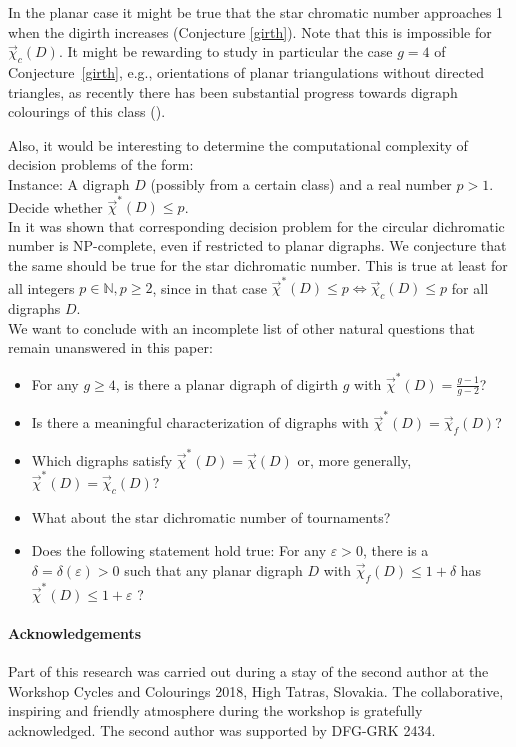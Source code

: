 \documentclass[fontsize=11pt,a4paper,DIV12]{scrartcl}
\theoremstyle{meiner}
\theoremstyle{definition}
\begin{document}
In the planar case it might be true that the star chromatic number
approaches 1 when the digirth increases (Conjecture \ref{girth}). Note
that this is impossible for $\vec{\chi}_c(D)$. It might be rewarding
to study in particular the case $g=4$ of Conjecture~\ref{girth}, e.g.,
orientations of planar triangulations without directed triangles,
as recently there has been substantial progress towards digraph
colourings of this class (\cite{mohar4}). 

Also, it would be interesting to determine the computational
complexity of decision problems of the form:
\\
Instance: A digraph $D$ (possibly from a certain class) and a real
number $p>1$. \\
Decide whether $\vec{\chi}^\ast(D) \leq p$.
\\
In \cite{bojannp} it was shown that corresponding decision problem for
the circular dichromatic number is NP-complete, even if restricted to
planar digraphs. We conjecture that the same should be true for the
star dichromatic number. This is true at least for all integers $p \in
\mathbb{N}, p\ge 2$, since in that case $\vec{\chi}^\ast(D) \leq p
\Leftrightarrow \vec{\chi}_c(D) \leq p$ for all digraphs $D$.\\

We want to conclude with an incomplete list of
other natural questions that remain unanswered in this paper:


\begin{itemize}
\item For any $g \ge 4$, is there a planar digraph of digirth $g$ with $\vec{\chi}^\ast(D)=\frac{g-1}{g-2}$?
\item Is there a meaningful characterization of digraphs with
  $\vec{\chi}^\ast(D)=\vec{\chi}_f(D)$? 
\item Which digraphs satisfy $\vec{\chi}^\ast(D)=\vec{\chi}(D)$ or,
  more generally,   $\vec{\chi}^\ast(D)=\vec{\chi}_c(D)$?
\item What about the star dichromatic number of tournaments?
\item Does the following statement hold true: For any $\varepsilon>0$, there is a $\delta=\delta(\varepsilon)>0$ such that any planar digraph $D$ with $\vec{\chi}_f(D) \leq 1+\delta$ has $\vec{\chi}^\ast(D) \leq 1+\varepsilon$ ?
\end{itemize}
\paragraph{Acknowledgements}
Part of this research was carried out during a stay of the second author at the Workshop Cycles and Colourings 2018, High Tatras, Slovakia. The collaborative, inspiring and friendly atmosphere during the workshop is gratefully acknowledged. The second author was supported by DFG-GRK 2434.
 

\end{document}
